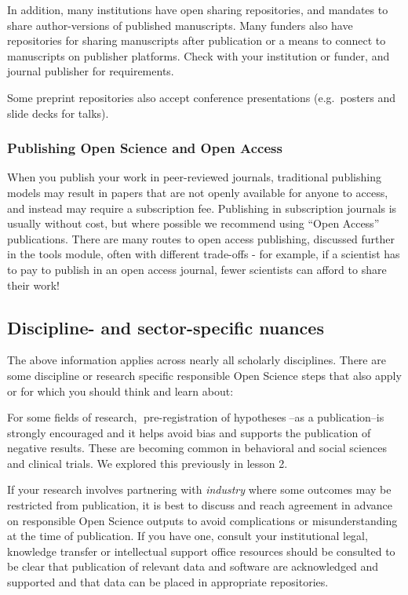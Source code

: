 \documentclass[
  letterpaper,
  DIV=11,
  numbers=noendperiod]{scrreport}
\begin{document}
In addition, many institutions have open sharing repositories, and
mandates to share author-versions of published manuscripts. Many funders
also have repositories for sharing manuscripts after publication or a
means to connect to manuscripts on publisher platforms. Check with your
institution or funder, and journal publisher for requirements.

Some preprint repositories also accept conference presentations
(e.g.~posters and slide decks for talks).

\hypertarget{publishing-open-science-and-open-access}{%
\subsubsection{Publishing Open Science and Open
Access}\label{publishing-open-science-and-open-access}}

When you publish your work in peer-reviewed journals, traditional
publishing models may result in papers that are not openly available for
anyone to access, and instead may require a subscription fee. Publishing
in subscription journals is usually without cost, but where possible we
recommend using ``Open Access'' publications. There are many routes to
open access publishing, discussed further in the tools module, often
with different trade-offs - for example, if a scientist has to pay to
publish in an open access journal, fewer scientists can afford to share
their work!

\hypertarget{discipline--and-sector-specific-nuances}{%
\subsection{Discipline- and sector-specific
nuances}\label{discipline--and-sector-specific-nuances}}

The above information applies across nearly all scholarly disciplines.
There are some discipline or research specific responsible Open Science
steps that also apply or for which you should think and learn about:

For some fields of research, 📖pre-registration of hypotheses📖--as a
publication--is strongly encouraged and it helps avoid bias and supports
the publication of negative results. These are becoming common in
behavioral and social sciences and clinical trials. We explored this
previously in lesson 2.

If your research involves partnering with \emph{industry} where some
outcomes may be restricted from publication, it is best to discuss and
reach agreement in advance on responsible Open Science outputs to avoid
complications or misunderstanding at the time of publication. If you
have one, consult your institutional legal, knowledge transfer or
intellectual support office resources should be consulted to be clear
that publication of relevant data and software are acknowledged and
supported and that data can be placed in appropriate repositories.
\end{document}
